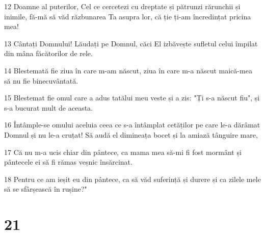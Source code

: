 \par 12 Doamne al puterilor, Cel ce cercetezi cu dreptate și pătrunzi rărunchii și inimile, fă-mă să văd răzbunarea Ta asupra lor, că ție ți-am încredințat pricina mea!
\par 13 Cântați Domnului! Lăudați pe Domnul, căci El izbăvește sufletul celui împilat din mâna făcătorilor de rele.
\par 14 Blestemată fie ziua în care m-am născut, ziua în care m-a născut maică-mea să nu fie binecuvântată.
\par 15 Blestemat fie omul care a adus tatălui meu veste și a zis: "Ți s-a născut fiu", și s-a bucurat mult de aceasta.
\par 16 Întâmple-se omului aceluia ceea ce s-a întâmplat cetăților pe care le-a dărâmat Domnul și nu le-a cruțat! Să audă el dimineața bocet și la amiază tânguire mare,
\par 17 Că nu m-a ucis chiar din pântece, ca mama mea să-mi fi fost mormânt și pântecele ei să fi rămas veșnic însărcinat.
\par 18 Pentru ce am ieșit eu din pântece, ca să văd suferință și durere și ca zilele mele să se sfârșească în rușine?"

\chapter{21}

